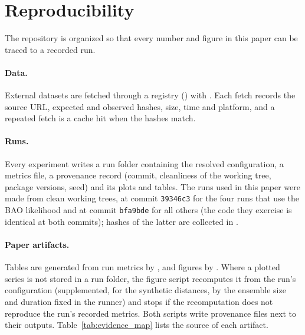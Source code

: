 \documentclass[11pt]{article}
\theoremstyle{plain}
\theoremstyle{definition}
\theoremstyle{remark}
\begin{document}
\section{Reproducibility}\label{app:repro}

The repository \cite{sixbirds_de_repo} is organized so that every number and figure in this paper can be traced to a recorded run.

\paragraph{Data.} External datasets are fetched through a registry () with . Each fetch records the source URL, expected and observed hashes, size, time and platform, and a repeated fetch is a cache hit when the hashes match.

\paragraph{Runs.} Every experiment writes a run folder  containing the resolved configuration, a metrics file, a provenance record (commit, cleanliness of the working tree, package versions, seed) and its plots and tables. The runs used in this paper were made from clean working trees, at commit \texttt{39346c3} for the four runs that use the BAO likelihood and at commit \texttt{bfa9bde} for all others (the code they exercise is identical at both commits); hashes of the latter are collected in .

\paragraph{Paper artifacts.} Tables are generated from run metrics by , and figures by . Where a plotted series is not stored in a run folder, the figure script recomputes it from the run's configuration (supplemented, for the synthetic distances, by the ensemble size and duration fixed in the runner) and stops if the recomputation does not reproduce the run's recorded metrics. Both scripts write provenance files next to their outputs. Table~\ref{tab:evidence_map} lists the source of each artifact.
\end{document}
